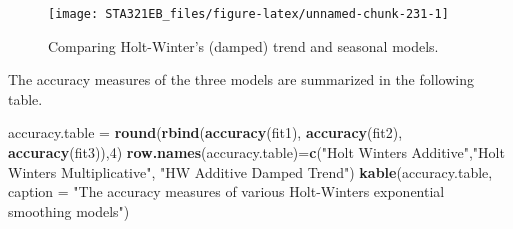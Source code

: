 \documentclass[
]{book}
\newenvironment{Shaded}{\begin{snugshade}}{\end{snugshade}}
\newcommand{\AttributeTok}[1]{\textcolor[rgb]{0.13,0.29,0.53}{#1}}
\newcommand{\DecValTok}[1]{\textcolor[rgb]{0.00,0.00,0.81}{#1}}
\newcommand{\DocumentationTok}[1]{\textcolor[rgb]{0.56,0.35,0.01}{\textbf{\textit{#1}}}}
\newcommand{\FloatTok}[1]{\textcolor[rgb]{0.00,0.00,0.81}{#1}}
\newcommand{\FunctionTok}[1]{\textcolor[rgb]{0.13,0.29,0.53}{\textbf{#1}}}
\newcommand{\NormalTok}[1]{#1}
\newcommand{\OtherTok}[1]{\textcolor[rgb]{0.56,0.35,0.01}{#1}}
\newcommand{\SpecialCharTok}[1]{\textcolor[rgb]{0.81,0.36,0.00}{\textbf{#1}}}
\newcommand{\StringTok}[1]{\textcolor[rgb]{0.31,0.60,0.02}{#1}}
\begin{document}
\begin{Shaded}
\end{Shaded}

\begin{figure}

{\centering \texttt{[image: STA321EB\_files/figure-latex/unnamed-chunk-231-1]} 

}

\caption{ Comparing Holt-Winter's (damped) trend and seasonal models.}\label{fig:unnamed-chunk-231}
\end{figure}

The accuracy measures of the three models are summarized in the following table.

\begin{Shaded}
\begin{Highlighting}[]
\NormalTok{accuracy.table }\OtherTok{=} \FunctionTok{round}\NormalTok{(}\FunctionTok{rbind}\NormalTok{(}\FunctionTok{accuracy}\NormalTok{(fit1), }\FunctionTok{accuracy}\NormalTok{(fit2), }\FunctionTok{accuracy}\NormalTok{(fit3)),}\DecValTok{4}\NormalTok{)}
\FunctionTok{row.names}\NormalTok{(accuracy.table)}\OtherTok{=}\FunctionTok{c}\NormalTok{(}\StringTok{"Holt Winters\textquotesingle{} Additive"}\NormalTok{,}\StringTok{"Holt Winters\textquotesingle{} Multiplicative"}\NormalTok{,}
    \StringTok{"HW Additive Damped Trend"}\NormalTok{)}
\FunctionTok{kable}\NormalTok{(accuracy.table, }\AttributeTok{caption =} \StringTok{"The accuracy measures of various Holt{-}Winter\textquotesingle{}s }
\StringTok{        exponential smoothing models"}\NormalTok{)}
\end{Highlighting}
\end{Shaded}
\end{document}
